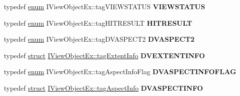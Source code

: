 \begin{DoxyCompactItemize}
\item 
\mbox{\label{interface_i_view_object_ex_a2c4cd8345b843c50cfca436ef71aebaa}} 
typedef \hyperlink{interfaceenum}{enum} I\+View\+Object\+Ex\+::tag\+V\+I\+E\+W\+S\+T\+A\+T\+US {\bfseries V\+I\+E\+W\+S\+T\+A\+T\+US}
\item 
\mbox{\label{interface_i_view_object_ex_ad3c06a98575213f713a4ae398f95140c}} 
typedef \hyperlink{interfaceenum}{enum} I\+View\+Object\+Ex\+::tag\+H\+I\+T\+R\+E\+S\+U\+LT {\bfseries H\+I\+T\+R\+E\+S\+U\+LT}
\item 
\mbox{\label{interface_i_view_object_ex_ac668d739744d734f4721ec4046859901}} 
typedef \hyperlink{interfaceenum}{enum} I\+View\+Object\+Ex\+::tag\+D\+V\+A\+S\+P\+E\+C\+T2 {\bfseries D\+V\+A\+S\+P\+E\+C\+T2}
\item 
\mbox{\label{interface_i_view_object_ex_aafce626d3c39a112888e771a35f4895b}} 
typedef \hyperlink{interfacestruct}{struct} \hyperlink{struct_i_view_object_ex_1_1tag_extent_info}{I\+View\+Object\+Ex\+::tag\+Extent\+Info} {\bfseries D\+V\+E\+X\+T\+E\+N\+T\+I\+N\+FO}
\item 
\mbox{\label{interface_i_view_object_ex_adc319aac26d2f38571b3a352e8e36a9d}} 
typedef \hyperlink{interfaceenum}{enum} I\+View\+Object\+Ex\+::tag\+Aspect\+Info\+Flag {\bfseries D\+V\+A\+S\+P\+E\+C\+T\+I\+N\+F\+O\+F\+L\+AG}
\item 
\mbox{\label{interface_i_view_object_ex_a868226575c8872a0d02ff92a0ae3fdc9}} 
typedef \hyperlink{interfacestruct}{struct} \hyperlink{struct_i_view_object_ex_1_1tag_aspect_info}{I\+View\+Object\+Ex\+::tag\+Aspect\+Info} {\bfseries D\+V\+A\+S\+P\+E\+C\+T\+I\+N\+FO}
\end{DoxyCompactItemize}
